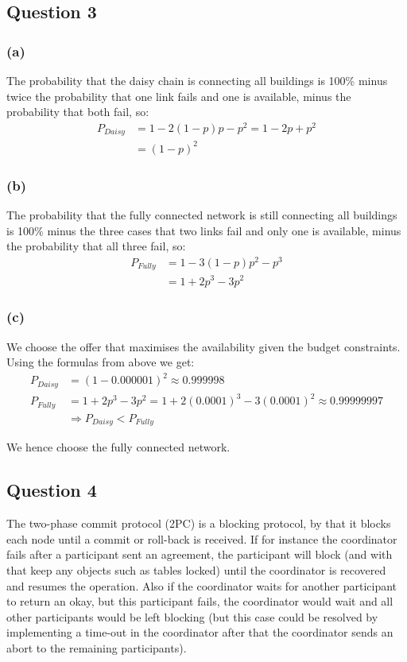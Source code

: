\documentclass[12pt,a4paper,fleqn]{article}
\begin{document}
\subsection*{Question 3}
\label{sec:eq3}

\subsubsection*{(a)}
The probability that the daisy chain is connecting all buildings is 100\% minus twice the probability that one link fails and one is available, minus the probability that both fail, so: 
\begin{align*}
P_{Daisy} &= 1-2(1-p)p - p^2 = 1-2p + p^2 \\
&= (1-p)^2
\end{align*}

\subsubsection*{(b)}
The probability that the fully connected network is still connecting all buildings is 100\% minus the three cases that two links fail and only one is available, minus the probability that all three fail, so:
\begin{align*}
P_{Fully} &= 1-3(1-p)p^2 - p^3 \\
&= 1 + 2p^3 - 3p^2
\end{align*}

\subsubsection*{(c)}
We choose the offer that maximises the availability given the budget constraints. Using the formulas from above we get:
\begin{align*}
P_{Daisy} &= (1-0.000001)^2 \approx 0.999998 \\
P_{Fully} &= 1 + 2p^3 - 3p^2 = 1 + 2(0.0001)^3-3(0.0001)^2 \approx 0.99999997 \\ 
&\Rightarrow P_{Daisy} < P_{Fully}
\end{align*}

We hence choose the fully connected network.

\subsection*{Question 4}
\label{sec:eq4}

The two-phase commit protocol (2PC) is a blocking protocol, by that it blocks each node until a commit or roll-back is received. If for instance the coordinator fails after a participant sent an agreement, the participant will block (and with that keep any objects such as tables locked) until the coordinator is recovered and resumes the operation. Also if the coordinator waits for another participant to return an okay, but this participant fails, the coordinator would wait and all other participants would be left blocking (but this case could be resolved by implementing a time-out in the coordinator after that the coordinator sends an abort to the remaining participants). 
\end{document}
